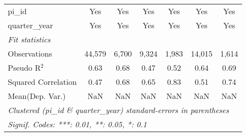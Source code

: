 \begin{tabular}{lcccccc}
   pi\_id                                                     & Yes           & Yes            & Yes           & Yes           & Yes           & Yes\\  
   quarter\_year                                              & Yes           & Yes            & Yes           & Yes           & Yes           & Yes\\  
   \midrule
   \emph{Fit statistics}\\
   Observations                                               & 44,579        & 6,700          & 9,324         & 1,983         & 14,015        & 1,614\\  
   Pseudo R$^2$                                               & 0.63          & 0.68           & 0.47          & 0.52          & 0.64          & 0.69\\  
   Squared Correlation                                        & 0.47          & 0.68           & 0.65          & 0.83          & 0.51          & 0.74\\  
Mean(Dep. Var.) & NaN & NaN & NaN & NaN & NaN & NaN \\
   \midrule \midrule
   \multicolumn{7}{l}{\emph{Clustered (pi\_id \& quarter\_year) standard-errors in parentheses}}\\
   \multicolumn{7}{l}{\emph{Signif. Codes: ***: 0.01, **: 0.05, *: 0.1}}\\
\end{tabular}
\par\endgroup
